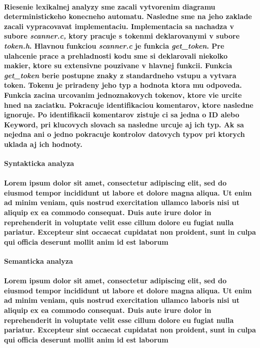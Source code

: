 \documentclass[12pt]{article}
\begin{document}
\paragraph{\indent Riesenie lexikalnej analyzy sme zacali vytvorenim diagramu deterministickeho konecneho automatu. Nasledne sme na jeho zaklade zacali vypracovavat implementaciu. Implementacia sa nachadza v subore \textit{scanner.c,} ktory pracuje s tokenmi deklarovanymi v subore \textit{token.h}. Hlavnou funkciou \textit{scanner.c} je funkcia \textit{get\_token}. Pre ulahcenie prace a prehladnosti kodu sme si deklarovali niekolko makier, ktore su extensivne pouzivane v hlavnej funkcii. Funkcia \textit{get\_token} berie postupne znaky z standardneho vstupu a vytvara token. Tokenu je priradeny jeho typ a hodnota ktora mu odpoveda. Funkcia zacina urcovanim jednoznakovych tokenov, ktore vie urcite hned na zaciatku. Pokracuje identifikaciou komentarov, ktore nasledne ignoruje. Po identifikacii komentarov zistuje ci sa jedna o ID alebo Keyword, pri klucovych slovach sa nasledne urcuje aj ich typ. Ak sa nejedna ani o jedno pokracuje kontrolov datovych typov pri ktorych uklada aj ich hodnoty.  \newline \\}

 \Large \textbf{Syntakticka analyza}\normalsize \\
\noindent\makebox[\linewidth]{\rule{\textwidth}{0.4pt}}

\paragraph{Lorem ipsum dolor sit amet, consectetur adipiscing elit, sed do eiusmod tempor incididunt ut labore et dolore magna aliqua. Ut enim ad minim veniam, quis nostrud exercitation ullamco laboris nisi ut aliquip ex ea commodo consequat. Duis aute irure dolor in reprehenderit in voluptate velit esse cillum dolore eu fugiat nulla pariatur. Excepteur sint occaecat cupidatat non proident, sunt in culpa qui officia deserunt mollit anim id est laborum \newline \\}

 \Large \textbf{Semanticka analyza}\normalsize \\
\noindent\makebox[\linewidth]{\rule{\textwidth}{0.4pt}}

\paragraph{Lorem ipsum dolor sit amet, consectetur adipiscing elit, sed do eiusmod tempor incididunt ut labore et dolore magna aliqua. Ut enim ad minim veniam, quis nostrud exercitation ullamco laboris nisi ut aliquip ex ea commodo consequat. Duis aute irure dolor in reprehenderit in voluptate velit esse cillum dolore eu fugiat nulla pariatur. Excepteur sint occaecat cupidatat non proident, sunt in culpa qui officia deserunt mollit anim id est laborum \newline \\}
\end{document}
